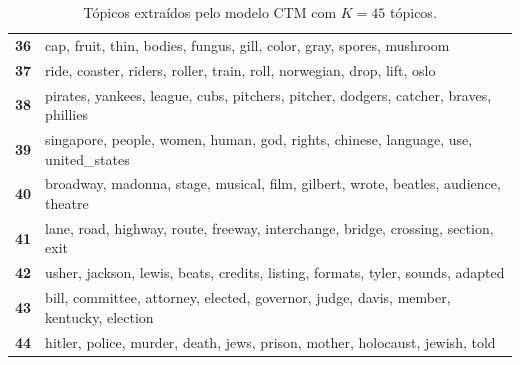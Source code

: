 \begin{table}[htpb]
\begin{tabularx}{\textwidth}{@{}l X@{}}
        \textbf{36} & cap, fruit, thin, bodies, fungus, gill, color, gray, spores, mushroom \\
        \textbf{37} & ride, coaster, riders, roller, train, roll, norwegian, drop, lift, oslo \\
        \textbf{38} & pirates, yankees, league, cubs, pitchers, pitcher, dodgers, catcher, braves, phillies \\
        \textbf{39} & singapore, people, women, human, god, rights, chinese, language, use, united\_states \\
        \textbf{40} & broadway, madonna, stage, musical, film, gilbert, wrote, beatles, audience, theatre \\
        \textbf{41} & lane, road, highway, route, freeway, interchange, bridge, crossing, section, exit \\
        \textbf{42} & usher, jackson, lewis, beats, credits, listing, formats, tyler, sounds, adapted \\
        \textbf{43} & bill, committee, attorney, elected, governor, judge, davis, member, kentucky, election \\
        \textbf{44} & hitler, police, murder, death, jews, prison, mother, holocaust, jewish, told \\
        \bottomrule
    \end{tabularx}
    \caption{Tópicos extraídos pelo modelo CTM com $K=45$ tópicos.}
    \label{tab:topicos_ctm_45}
\end{table}
